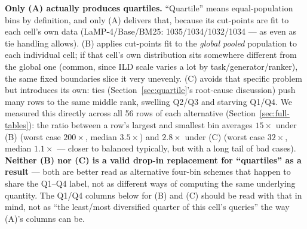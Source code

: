 \documentclass[10pt]{article}
\begin{document}
\textbf{Only (A) actually produces quartiles.} ``Quartile'' means equal-population
bins by definition, and only (A) delivers that, because its cut-points are fit to
each cell's own data (LaMP-4/Base/BM25: 1035/1034/1032/1034 --- as even as tie
handling allows). (B) applies cut-points fit to the \emph{global pooled} population
to each individual cell; if that cell's own distribution sits somewhere different
from the global one (common, since ILD scale varies a lot by task/generator/ranker),
the same fixed boundaries slice it very unevenly. (C) avoids that specific problem
but introduces its own: ties (Section~\ref{sec:quartile}'s root-cause discussion)
push many rows to the same middle rank, swelling Q2/Q3 and starving Q1/Q4. We
measured this directly across all 56 rows of each alternative (Section~\ref{sec:full-tables}):
the ratio between a row's largest and smallest bin averages $15\times$ under (B)
(worst case $200\times$, median $3.5\times$) and $2.8\times$ under (C) (worst case
$32\times$, median $1.1\times$ --- closer to balanced typically, but with a long
tail of bad cases). \textbf{Neither (B) nor (C) is a valid drop-in replacement for
``quartiles'' as a result} --- both are better read as alternative four-bin
schemes that happen to share the Q1--Q4 label, not as different ways of computing
the same underlying quantity. The Q1/Q4 columns below for (B) and (C) should be
read with that in mind, not as ``the least/most diversified quarter of this cell's
queries'' the way (A)'s columns can be.
\end{document}
